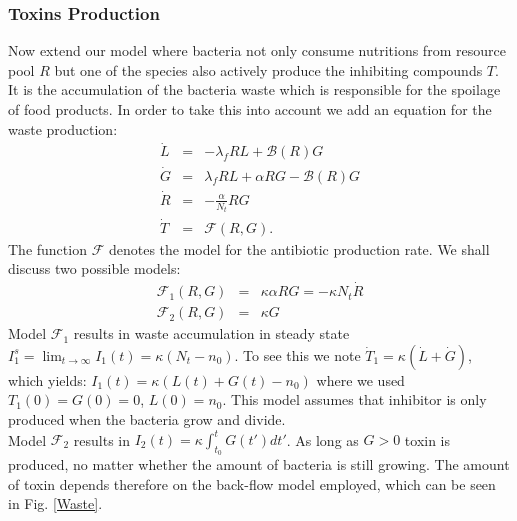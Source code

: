 \documentclass[10pt,A4paper]{article}
\begin{document}


\subsubsection{Toxins Production}
Now extend our model where bacteria not only consume nutritions from resource pool $R$ but one of the species also actively produce the inhibiting compounds $T$. 
It is the accumulation of the bacteria waste which is responsible for the spoilage of food products. 
In order to take this into account we add an equation for the waste production:
\begin{eqnarray}
\dot{L} &=& - \lambda_f R L + \mathcal{B}(R)G\\
\dot{G} &=& \lambda_f R L +\alpha R G-\mathcal{B}(R)G\\
\dot{R} &=&-\frac{\alpha}{N_t} R G\\
\dot{T} &=& \mathcal{F}(R,G).
\end{eqnarray}
The function $\mathcal{F}$ denotes the model for the antibiotic production rate. 
We shall discuss two possible models:
\begin{eqnarray}
\mathcal{F}_1(R,G)&=&\kappa\alpha R G=-\kappa N_t\dot{R}\\
\mathcal{F}_2(R,G)&=&\kappa G
\end{eqnarray}
Model $\mathcal{F}_1$ results in waste accumulation in steady state $I_1^s=\lim_{t\to\infty}I_1(t)=\kappa(N_t-n_0)$. 
To see this we note $\dot{T}_1=\kappa(\dot{L}+\dot{G})$, which yields: $I_1(t)=\kappa(L(t)+G(t)-n_0)$ where we used $T_1(0)=G(0)=0$, $L(0)=n_0$. 
This model assumes that inhibitor is only produced when the bacteria grow and divide. \\

Model $\mathcal{F}_2$ results in $I_2(t)=\kappa\int_{t_0}^tG(t')dt'$. 
As long as $G>0$ toxin is produced, no matter whether the amount of bacteria is still growing. 
The amount of toxin depends therefore on the back-flow model employed, which can be seen in Fig. \ref{Waste}. 
\end{document}

